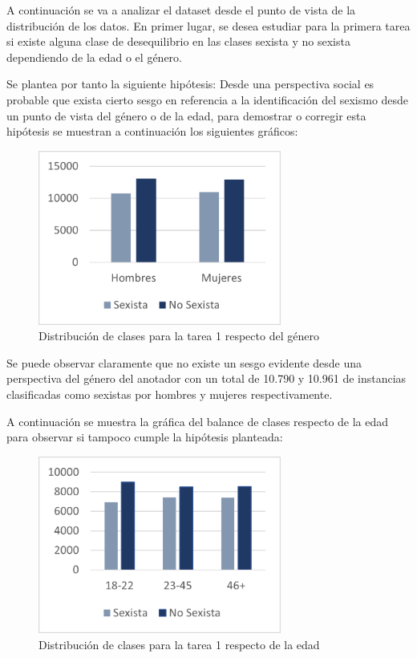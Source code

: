 A continuación se va a analizar el dataset desde el punto de vista de la distribución de los datos. En primer lugar, se desea estudiar para la primera tarea si existe alguna clase de desequilibrio en las clases sexista y no sexista dependiendo de la edad o el género.

Se plantea por tanto la siguiente hipótesis: Desde una perspectiva social es probable que exista cierto sesgo en referencia a la identificación del sexismo desde un punto de vista del género o de la edad, para demostrar o corregir esta hipótesis se muestran a continuación los siguientes gráficos:

\begin{figure}[H]
    \centering
    \includegraphics[width=8cm]{imagenes/Evaluacion/dataset_study/gender_task1.png}
    \caption{\centering Distribución de clases para la tarea 1 respecto del género}
    \label{gender-distribution}
\end{figure}

Se puede observar claramente que no existe un sesgo evidente desde una perspectiva del género del anotador con un total de 10.790 y 10.961 de instancias clasificadas como sexistas por hombres y mujeres respectivamente. 

A continuación se muestra la gráfica del balance de clases respecto de la edad para observar si tampoco cumple la hipótesis planteada:

\begin{figure}[H]
    \centering
    \includegraphics[width=8cm]{imagenes/Evaluacion/dataset_study/age_task1.png}
    \caption{\centering Distribución de clases para la tarea 1 respecto de la edad}
    \label{age-distribution}
\end{figure}

